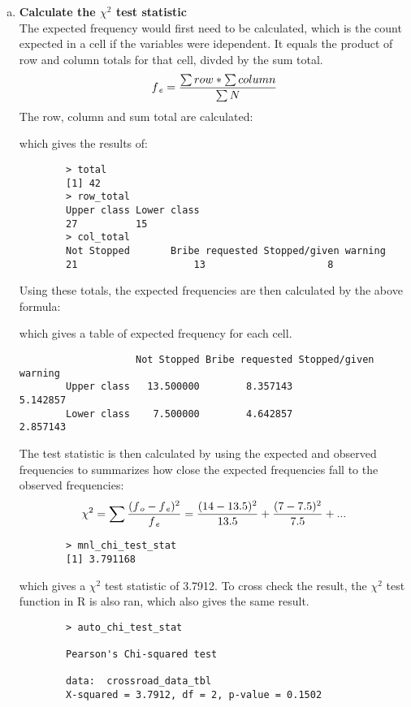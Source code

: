 \documentclass[12pt,letterpaper]{article}
\begin{document}
\begin{enumerate} [(a)]
	\item \textbf{Calculate the $\chi^2$ test statistic } \\
	The expected frequency would first need to be calculated, which is the count expected in a cell if the variables were idependent. It equals the product of row and column totals for that cell, divded by the sum total.
		$$ f\textsubscript{\textit{e}} = \frac{\sum row * \sum column}{\sum N}$$
	The row, column and sum total are calculated:
	
	which gives the results of:
	\begin{verbatim}
		> total
		[1] 42
		> row_total
		Upper class Lower class 
		27          15 
		> col_total
		Not Stopped       Bribe requested Stopped/given warning 
		21                    13                     8 
	\end{verbatim}
	Using these totals, the expected frequencies are then calculated by the above formula:
	
	which gives a table of expected frequency for each cell.
	\begin{verbatim}
		            Not Stopped Bribe requested Stopped/given warning
		Upper class   13.500000        8.357143              5.142857
		Lower class    7.500000        4.642857              2.857143
	\end{verbatim}
	The test statistic is then calculated by using the expected and observed frequencies to summarizes how close the expected frequencies fall to the observed frequencies:
		$$ \chi^2 = \sum \frac{(f\textsubscript{\textit{o}} - f\textsubscript{\textit{e}})^2}{f\textsubscript{\textit{e}}} = \frac{(14 - 13.5)^2}{13.5} + \frac{(7 - 7.5)^2}{7.5} + ...$$
	
	\begin{verbatim}
		> mnl_chi_test_stat
		[1] 3.791168
	\end{verbatim}
	which gives a  $\chi^2$ test statistic of 3.7912. To cross check the result, the $\chi^2$ test function in R is also ran, which also gives the same result.
	
	\begin{verbatim}
		> auto_chi_test_stat
		
		Pearson's Chi-squared test
		
		data:  crossroad_data_tbl
		X-squared = 3.7912, df = 2, p-value = 0.1502
	\end{verbatim}


\end{enumerate}
\end{document}
